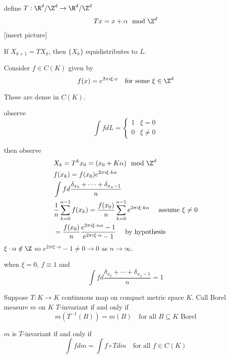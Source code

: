 \begin{definition}
	define $T : \R^d / \Z^d \to \R^d/ \Z^d $
\begin{align*}
	T x = x + \alpha \mod{\Z^d}
\end{align*} 
[insert picture]
\begin{claim}
If $X_{k+1} = T X_{k}$, then $\{X_k\}$ equidistributes to  $L$.
\end{claim}

Consider $f \in C(K)$ given by 
\[
	f(x) = e^{2 \pi i \xi \cdot x} \quad \text{for some } \xi \in \Z^d
\] 
\end{definition}

\begin{exercise}
	These are dense in $C(K)$.
\end{exercise}

observe
\[
	\int f dL = 
	\begin{cases}
		1 & \xi = 0 \\
		0 & \xi \neq 0
	\end{cases}
\] 

then observe
\begin{align*}
	&X_k = T^{k} x_0 = (x_0 + K\alpha) \mod{\Z^d} \\
	&f(x_k) = f(x_0) e^{2 \pi i \xi \cdot k \alpha} \\
	&\int f d \frac{\delta_{x_0} + \cdots + \delta_{x_n -1}}{n} \\
	&\frac{1}{n} \sum_{k=0}^{n-1} f(x_k) = \frac{f(x_0)}{n} \sum_{k=0}^{n-1} e^{2\pi i \xi \cdot k\alpha} \quad \text{ assume } \xi \neq 0 \\
	&= \frac{f(x_0)}{n} \frac{e^{2\pi i \xi \cdot n\alpha} -1}{e^{2\pi i \xi \cdot \alpha } -1} \quad \text{ by hypothesis}
\end{align*} 
$\xi \cdot \alpha \notin \Z$ so $e^{2\pi i \xi \cdot \alpha} - 1 \neq 0 \to 0$ as $n \to \infty$.


when $\xi =0$, $f \equiv 1$ and
\[
	\int f d \frac{\delta_{x_0} + \cdots + \delta_{x_n -1}}{n} =1
\] 

\begin{definition}
	Suppose $T:K \to K$ continuous map on compact metric space $K$. Call Borel measure $m$ on $K$ $T$-invariant if and only if
	\[
		m(T^{-1}(B)) = m(B) \quad \text{for all } B \subseteq K \text{ Borel}
	\] 
\end{definition}


\begin{example}
	$m$ is $T$-invariant if and only if 
	\[
		\int f dm = \int f \circ T dm \quad \text{for all } f \in C(K)
	\] 
\end{example}

